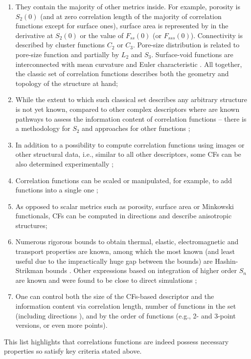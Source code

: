 \documentclass[reprint,amsmath,amssymb,aps,pre,showkeys,showpacs]{revtex4-1}
\begin{document}
\begin{enumerate}
  \item They contain the majority of other metrics inside. For example, porosity
    is $S_2(0)$ (and at zero correlation length of the majority of correlation
    functions except for surface ones), surface area is represented by in the
    derivative at $S_2(0)$ \cite{debye1957scattering} or the value of
    $F_{ss}(0)$ (or $F_{sss}(0)$). Connectivity is described by cluster
    functions $C_2$ or $C_3$. Pore-size distribution is related to pore-size
    function and partially by $L_2$ and $S_3$. Surface-void functions are
    interconnected with mean curvature and Euler characteristic
    \cite{ma2020generation}. All together, the classic set of correlation
    functions describes both the geometry and topology of the structure at hand;
  \item While the extent to which such classical set describes any arbitrary
    structure is not yet known, compared to other complex descriptors where are
    known pathways to assess the information content of correlation functions --
    there is a methodology for $S_2$ \cite{Gommes2} and approaches for other
    functions \cite{Degeneraty.045306,cherkasov2023towards};
  \item In addition to a possibility to compute correlation functions using
    images or other structural data, i.e., similar to all other descriptors,
    some CFs can be also determined experimentally
    \cite{debye1957scattering,barrall1992nmr,dietrich1995scattering,li2018accurate};
  \item Correlation functions can be scaled \cite{karsaninaPRL} or manipulated,
    for example, to add functions into a single one \cite{moctezuma2002};
  \item As opposed to scalar metrics such as porosity, surface area or Minkowski
    functionals, CFs can be computed in directions and describe anisotropic
    structures;
  \item Numerous rigorous bounds to obtain thermal, elastic, electromagnetic and
    transport properties are known, among which the most known (and least useful
    due to the impractically huge gap between the bounds) are Hashin-Strikman
    bounds \cite{hashin1963variational}. Other expressions based on integration
    of higher order $S_n$ are known and were found to be close to direct
    simulations
    \cite{brown1955solid,beran1965use,milton1981bounds,hlushkou2015effective};
  \item One can control both the size of the CFs-based descriptor and the
    information content via correlation length, number of functions in the set
    (including directions \cite{EPL2}), and by the order of functions (e.g., 2-
    and 3-point versions, or even more points).
\end{enumerate}
This list highlights that correlations functions are indeed possess necessary
properties so satisfy key criteria stated above.
\end{document}
